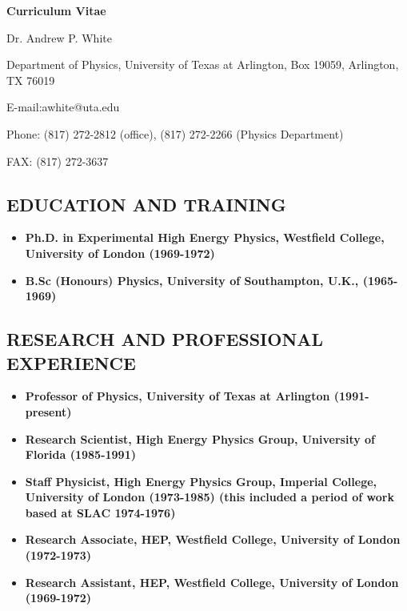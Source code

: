 \begin{center}

\textbf{Curriculum Vitae}

Dr. Andrew P. White

Department of Physics, University of Texas at Arlington, Box 19059, Arlington, TX 76019

E-mail:awhite@uta.edu

Phone: (817) 272-2812 (office), (817) 272-2266 (Physics Department)

FAX: (817) 272-3637

\end{center}


\subsection{EDUCATION AND TRAINING}
\begin{itemize}
\item{
\textbf{Ph.D. in Experimental High Energy Physics, Westfield College, University of London (1969-1972) }
}

\item{
\textbf{B.Sc (Honours) Physics, University of  Southampton, U.K., (1965-1969) }
}
\end{itemize}
\subsection{RESEARCH AND PROFESSIONAL EXPERIENCE}
\begin{itemize}
\item{
\textbf{Professor of Physics,  University of Texas at Arlington (1991-present)}
}

\item{
\textbf{Research Scientist, High Energy Physics Group, University of Florida (1985-1991) } 
}

\item{
\textbf{Staff Physicist, High Energy Physics Group, Imperial College, University of London (1973-1985) 
(this included a period of work based at SLAC 1974-1976) }
} 

\item{
\textbf{Research Associate, HEP, Westfield College, University of London (1972-1973) } 
}

\item {
\textbf{Research Assistant, HEP, Westfield College, University of London (1969-1972) } 
}
\end{itemize}

